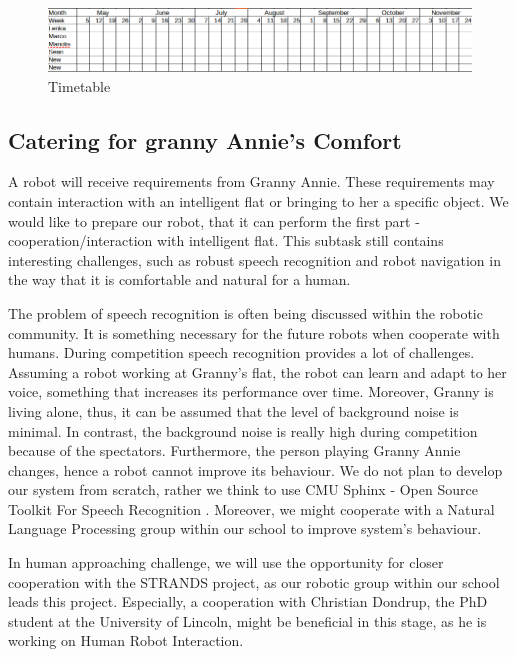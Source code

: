 \documentclass[conference]{IEEEtran}
\begin{document}
\begin{figure}[!htb]
\centering
\includegraphics[width=\textwidth]{timetable.png}
\caption{Timetable}
\label{fig:plan}
\end{figure}

\subsection{Catering for granny Annie’s Comfort}

A robot will receive requirements from Granny Annie. These requirements may contain interaction with an intelligent flat or bringing to her a specific object. We would like to prepare our robot, that it can perform the first part - cooperation/interaction with intelligent flat. This subtask still contains interesting challenges, such as robust speech recognition and robot navigation in the way that it is comfortable and natural for a human. %

The problem of speech recognition is often being discussed within the robotic community. It is something necessary for the future robots when cooperate with humans. During competition speech recognition provides a lot of challenges. Assuming a robot working at Granny's flat, the robot can learn and adapt to her voice, something that increases its performance over time. Moreover, Granny is living alone, thus, it can be assumed that the level of background noise is minimal. In contrast, the background noise is really high during competition because of the spectators. Furthermore, the person playing Granny Annie changes, hence a robot cannot improve its behaviour. We do not plan to develop our system from scratch, rather we think to use CMU Sphinx - Open Source Toolkit For Speech Recognition \cite{cmu}. %
Moreover, we might cooperate with a Natural Language Processing group within our school to improve system's behaviour.

In human approaching challenge,%
we will use the opportunity for closer cooperation with the STRANDS \cite{strands} project, as our robotic group within our school leads this project. Especially, a cooperation with Christian Dondrup, the PhD student at the University of Lincoln, might be beneficial in this stage, as he is working on Human Robot Interaction.
\end{document}
